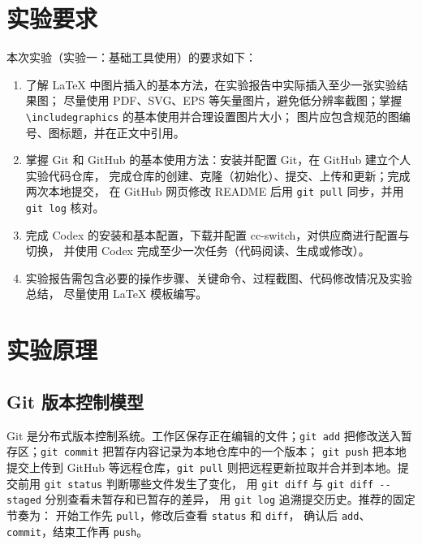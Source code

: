 \documentclass{SYSUReport}
\date{2026 年 9 月 10 日}
\begin{document}
\cover
\thispagestyle{empty} %
\clearpage

\tableofcontents
\clearpage

\setcounter{page}{1}

\section{实验要求}

本次实验（实验一：基础工具使用）的要求如下：

\begin{enumerate}
  \item 了解 LaTeX 中图片插入的基本方法，在实验报告中实际插入至少一张实验结果图；
  尽量使用 PDF、SVG、EPS 等矢量图片，避免低分辨率截图；掌握
  \texttt{\textbackslash includegraphics} 的基本使用并合理设置图片大小；
  图片应包含规范的图编号、图标题，并在正文中引用。
  \item 掌握 Git 和 GitHub 的基本使用方法：安装并配置 Git，在 GitHub 建立个人实验代码仓库，
  完成仓库的创建、克隆（初始化）、提交、上传和更新；完成两次本地提交，
  在 GitHub 网页修改 README 后用 \texttt{git pull} 同步，并用 \texttt{git log} 核对。
  \item 完成 Codex 的安装和基本配置，下载并配置 cc-switch，对供应商进行配置与切换，
  并使用 Codex 完成至少一次任务（代码阅读、生成或修改）。
  \item 实验报告需包含必要的操作步骤、关键命令、过程截图、代码修改情况及实验总结，
  尽量使用 LaTeX 模板编写。
\end{enumerate}

\section{实验原理}

\subsection{Git 版本控制模型}

Git 是分布式版本控制系统。工作区保存正在编辑的文件；\texttt{git add}
把修改送入暂存区；\texttt{git commit} 把暂存内容记录为本地仓库中的一个版本；
\texttt{git push} 把本地提交上传到 GitHub 等远程仓库，\texttt{git pull}
则把远程更新拉取并合并到本地。提交前用 \texttt{git status} 判断哪些文件发生了变化，
用 \texttt{git diff} 与 \texttt{git diff -{}-staged} 分别查看未暂存和已暂存的差异，
用 \texttt{git log} 追溯提交历史。推荐的固定节奏为：
开始工作先 \texttt{pull}，修改后查看 \texttt{status} 和 \texttt{diff}，
确认后 \texttt{add}、\texttt{commit}，结束工作再 \texttt{push}。
\end{document}
